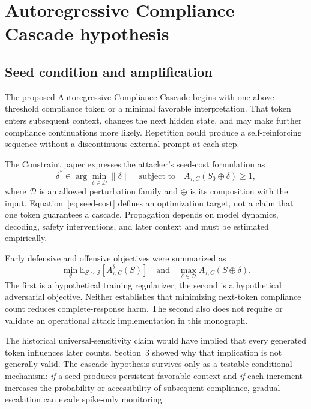 \section{Autoregressive Compliance Cascade hypothesis}
\subsection{Seed condition and amplification}
The proposed Autoregressive Compliance Cascade begins with one above-threshold compliance token or a minimal favorable interpretation. That token enters subsequent context, changes the next hidden state, and may make further compliance continuations more likely. Repetition could produce a self-reinforcing sequence without a discontinuous external prompt at each step.

The Constraint paper expresses the attacker's seed-cost formulation as
\begin{equation}
\delta^*\in\arg\min_{\delta\in\mathcal D}\|\delta\|
\quad\text{subject to}\quad
A_{\tau,C}(S_0\oplus\delta)\geq1,
\label{eq:seed-cost}
\end{equation}
where $\mathcal D$ is an allowed perturbation family and $\oplus$ is its composition with the input. Equation~\eqref{eq:seed-cost} defines an optimization target, not a claim that one token guarantees a cascade. Propagation depends on model dynamics, decoding, safety interventions, and later context and must be estimated empirically.

Early defensive and offensive objectives were summarized as
\begin{equation}
\min_\theta \mathbb E_{S\sim\mathcal S}[A_{\tau,C}^\theta(S)]
\quad\text{and}\quad
\max_{\delta\in\mathcal D}A_{\tau,C}(S\oplus\delta).
\label{eq:dual-use-objectives}
\end{equation}
The first is a hypothetical training regularizer; the second is a hypothetical adversarial objective. Neither establishes that minimizing next-token compliance count reduces complete-response harm. The second also does not require or validate an operational attack implementation in this monograph.

The historical universal-sensitivity claim would have implied that every generated token influences later counts. Section~3 showed why that implication is not generally valid. The cascade hypothesis survives only as a testable conditional mechanism: \emph{if} a seed produces persistent favorable context and \emph{if} each increment increases the probability or accessibility of subsequent compliance, gradual escalation can evade spike-only monitoring.

